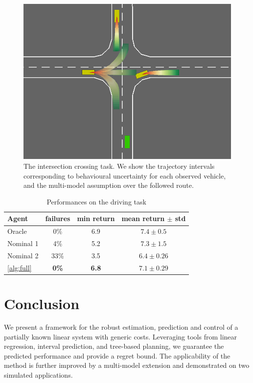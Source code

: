 \documentclass{article}
\begin{document}
\begin{figure}[t]
	\centering
	\includegraphics[width=0.7\linewidth]{img/highway-small}
	\caption{The intersection crossing task. We show the trajectory intervals corresponding to behavioural uncertainty for each observed vehicle, and the multi-model assumption over the followed route.}
\end{figure}

\begin{table}[t]
	\caption{Performances on the driving task}
	\label{tab:driving}
	\centering
	\begin{tabular}{lccc}
		\toprule
		Agent &
		failures &
        min return &
		mean return $\pm$ std  \\
		\midrule
		Oracle & 0\% & {6.9} & $7.4 \pm 0.5$ \\
		\midrule
		{Nominal 1} & 4\% & {5.2} & $\mathbf{7.3} \pm 1.5$ \\
		{Nominal 2} & 33\% & {3.5} & $6.4 \pm 0.26$ \\
		\autoref{alg:full} & \textbf{0\%} & \textbf{6.8} & $7.1 \pm 0.29$ \\
		\bottomrule
	\end{tabular}
\end{table}

\section*{Conclusion}

We present a framework for the robust estimation, prediction and control of a partially known linear system with generic costs. Leveraging tools from linear regression, interval prediction, and tree-based planning, we guarantee the predicted performance and provide a regret bound. The applicability of the method is further improved by a multi-model extension and demonstrated on two simulated applications.
\end{document}
